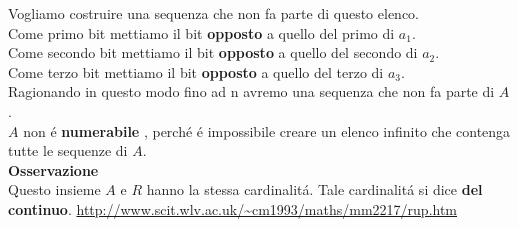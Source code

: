 \documentclass[11pt]{article}
\begin{document}
            Vogliamo costruire una sequenza che non fa parte di questo elenco. \\
            Come primo bit mettiamo il bit \textbf{opposto} a quello del primo di $a_{1}$.\\
            Come secondo bit mettiamo il bit \textbf{opposto} a quello del secondo di $a_{2}$.\\
            Come terzo bit mettiamo il bit \textbf{opposto} a quello del terzo di $a_{3}$.\\
            Ragionando in questo modo fino ad n avremo una sequenza che non fa parte di $A$.
            \\$A$ non \'e \textbf{numerabile} , perch\'e \'e impossibile creare un elenco infinito che contenga tutte le sequenze di $A$.\\
            \textbf{Osservazione}\\ 
            Questo insieme $A$ e $R$ hanno la stessa cardinalit\'a. Tale cardinalit\'a si dice \textbf{del continuo}. \url{http://www.scit.wlv.ac.uk/~cm1993/maths/mm2217/rup.htm}
\end{document}
